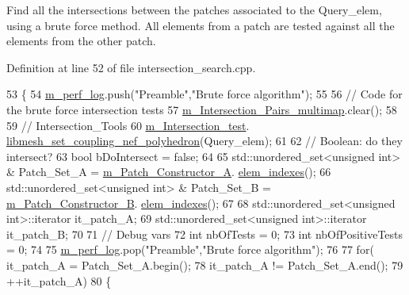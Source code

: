 Find all the intersections between the patches associated to the Query\+\_\+elem, using a brute force method. All elements from a patch are tested against all the elements from the other patch. 



Definition at line 52 of file intersection\+\_\+search.\+cpp.


\begin{DoxyCode}
53     \{
54         \hyperlink{classcarl_1_1_intersection___search_aebe6210287a36909206b1a59f9cd17e0}{m\_perf\_log}.push(\textcolor{stringliteral}{"Preamble"},\textcolor{stringliteral}{"Brute force algorithm"});
55 
56         \textcolor{comment}{// Code for the brute force intersection tests}
57         \hyperlink{classcarl_1_1_intersection___search_a21bb47bfa3021d18b718919ad4a245d7}{m\_Intersection\_Pairs\_multimap}.clear();
58 
59         \textcolor{comment}{// Intersection\_Tools}
60         \hyperlink{classcarl_1_1_intersection___search_afeedb5ff9144638151b7f956cf113fc4}{m\_Intersection\_test}.
      \hyperlink{classcarl_1_1_intersection___tools_acf2d17e703441bc9e3ed05d98f51ba85}{libmesh\_set\_coupling\_nef\_polyhedron}(Query\_elem);
61 
62         \textcolor{comment}{// Boolean: do they intersect?}
63         \textcolor{keywordtype}{bool} bDoIntersect = \textcolor{keyword}{false};
64 
65         std::unordered\_set<unsigned int> & Patch\_Set\_A = \hyperlink{classcarl_1_1_intersection___search_a3bc66e4e9a0b41d9b20093d4f6ca7611}{m\_Patch\_Constructor\_A}.
      \hyperlink{classcarl_1_1_patch__construction_ad92eca042b223e8be1cb3984a3dc8cba}{elem\_indexes}();
66         std::unordered\_set<unsigned int> & Patch\_Set\_B = \hyperlink{classcarl_1_1_intersection___search_a2e2b5a2784eeca7b558b6b93ae71a2e8}{m\_Patch\_Constructor\_B}.
      \hyperlink{classcarl_1_1_patch__construction_ad92eca042b223e8be1cb3984a3dc8cba}{elem\_indexes}();
67 
68         std::unordered\_set<unsigned int>::iterator it\_patch\_A;
69         std::unordered\_set<unsigned int>::iterator it\_patch\_B;
70 
71         \textcolor{comment}{// Debug vars}
72         \textcolor{keywordtype}{int} nbOfTests = 0;
73         \textcolor{keywordtype}{int} nbOfPositiveTests = 0;
74 
75         \hyperlink{classcarl_1_1_intersection___search_aebe6210287a36909206b1a59f9cd17e0}{m\_perf\_log}.pop(\textcolor{stringliteral}{"Preamble"},\textcolor{stringliteral}{"Brute force algorithm"});
76 
77         \textcolor{keywordflow}{for}(    it\_patch\_A =  Patch\_Set\_A.begin();
78                 it\_patch\_A != Patch\_Set\_A.end();
79                 ++it\_patch\_A)
80         \{

\end{DoxyCode}
